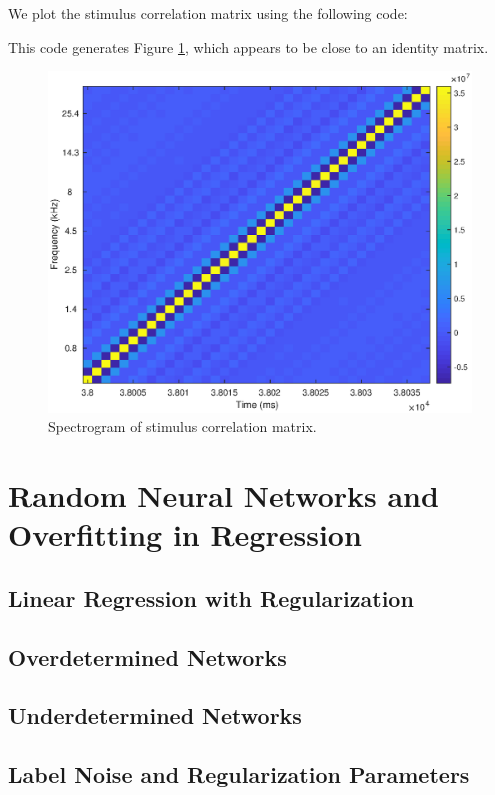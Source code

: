 \documentclass[11pt, oneside]{article}
\begin{document}
We plot the stimulus correlation matrix using the following code:

This code generates Figure \ref{fig:stim_corr}, which appears to be close to an identity matrix.

\begin{figure}[ht!]
\includegraphics[width=1\textwidth]{stimulus_correlation.eps}
\caption{Spectrogram of stimulus correlation matrix.}
\label{fig:stim_corr}
\end{figure}


\section{Random Neural Networks and Overfitting in Regression}

\subsection{Linear Regression with Regularization}

\subsection{Overdetermined Networks}

\subsection{Underdetermined Networks}

\subsection{Label Noise and Regularization Parameters}
\end{document}
